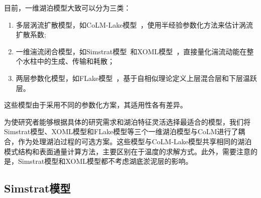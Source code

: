 目前，一维湖泊模型大致可以分为三类：
\begin{enumerate}
  \item 多层涡流扩散模型，如CoLM-Lake模型~\citep{daiLakeSchemeCommon2018}，使用半经验参数化方法来估计涡流扩散系数;
  \item 一维湍流闭合模型，如Simstrat模型~\citep{goudsmit2002application}和XOML模型~\citep{ling2015multilevel}，直接量化湍流动能在整个水柱中的生成、传输和耗散；
  \item 两层参数化模型，如FLake模型~\citep{mironovCOSMOTechnicalReport2008a}，基于自相似理论定义上层混合层和下层温跃层。
\end{enumerate}
这些模型由于采用不同的参数化方案，其适用性各有差异。

为使研究者能够根据具体的研究需求和湖泊特征灵活选择最适合的模型，我们将Simstrat模型、XOML模型和FLake模型等三个一维湖泊模型与CoLM进行了耦合，作为处理湖泊过程的可选方案。这些模型与CoLM-Lake模型共享相同的湖泊模式结构和表面通量计算方法，主要区别在于温度的求解方式。此外，需要注意的是，Simstrat模型和XOML模型都不考虑湖底淤泥层的影响。
%
\subsection{Simstrat模型}\label{Simstrat模型}
\label{Simstrat Model}

